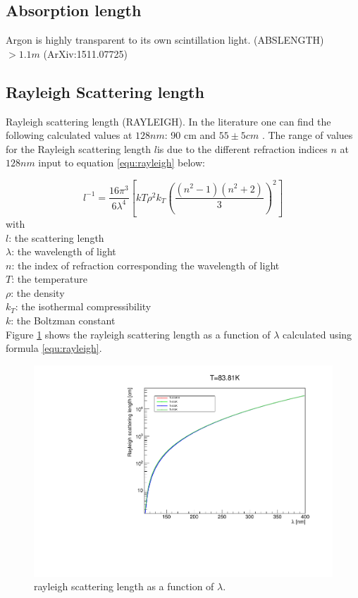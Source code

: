 \documentclass{article}
\begin{document}
\subsection{Absorption length}
Argon is highly transparent to its own scintillation light. (ABSLENGTH)
  $> 1.1 m$  (ArXiv:1511.07725) 
  \subsection{Rayleigh Scattering length}
  Rayleigh scattering length (RAYLEIGH). In the literature one can find the following calculated values at $128 nm$:  90 cm \cite{ref:vg}
  and $55\pm  5 cm$ \cite{ref:grace}. The  range of values for the Rayleigh
scattering length $l$is due to the different refraction indices $n$ at $128nm$  input  to equation  \ref{equ:rayleigh} below:

  \begin{equation}
l^{-1} = \frac{16\pi^3}{6\lambda^4} \left[ kT \rho^2 k_T \left( \frac{(n^2 - 1)(n^2 + 2)}{3} \right)^2\right]
  \label{equ:rayleigh}
\end{equation}
\noindent
    with\\
    $l$: the scattering length\\
    $\lambda$:  the wavelength of light\\
    $n$: the index of refraction corresponding the wavelength of light\\
    $T$: the temperature \\
    $\rho$: the density \\
    $k_T$: the isothermal compressibility\\
    $k$: the Boltzman constant\\

Figure \ref{fig:rayleigh} shows the rayleigh scattering length as a function of $\lambda$ calculated using formula \ref{equ:rayleigh}.

  
  \begin{figure}[ht]
    \begin{center}
      \includegraphics[width=35.5pc]{rayleigh.pdf}
    \end{center}
    \caption{\label{fig:rayleigh}rayleigh scattering length as a function of $\lambda$.}
  \end{figure}
\end{document}

